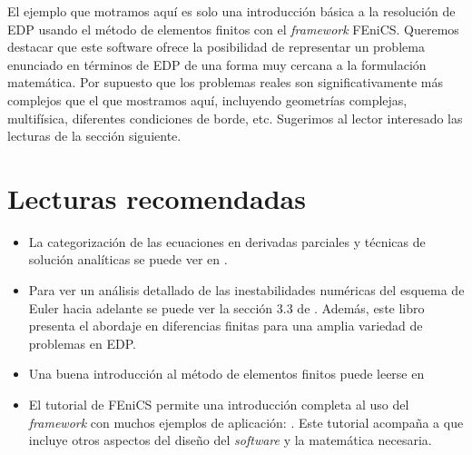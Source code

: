 El ejemplo que motramos aquí es solo una introducción básica a la resolución de EDP usando el método de elementos finitos con el \textit{framework} FEniCS. Queremos destacar que este software ofrece la posibilidad de representar un problema enunciado en términos de EDP de una forma muy cercana a la formulación matemática. Por supuesto que los problemas reales son significativamente más complejos que el que mostramos aquí, incluyendo geometrías complejas, multifísica, diferentes condiciones de borde, etc. Sugerimos al lector interesado las lecturas de la sección siguiente.

\section{Lecturas recomendadas}
\begin{itemize}
 \item La categorización de las ecuaciones en derivadas parciales y técnicas de solución analíticas se puede ver en .
 \item Para ver un análisis detallado de las inestabilidades numéricas del esquema de Euler hacia adelante se puede ver la sección 3.3 de . Además, este libro presenta el abordaje en diferencias finitas para una amplia variedad de problemas en EDP.
 \item Una buena introducción al método de elementos finitos puede leerse en 
 \item El tutorial de FEniCS permite una introducción completa al uso del \textit{framework} con muchos ejemplos de aplicación: . Este tutorial acompaña a  que incluye otros aspectos del diseño del \textit{software} y la matemática necesaria.
\end{itemize}


